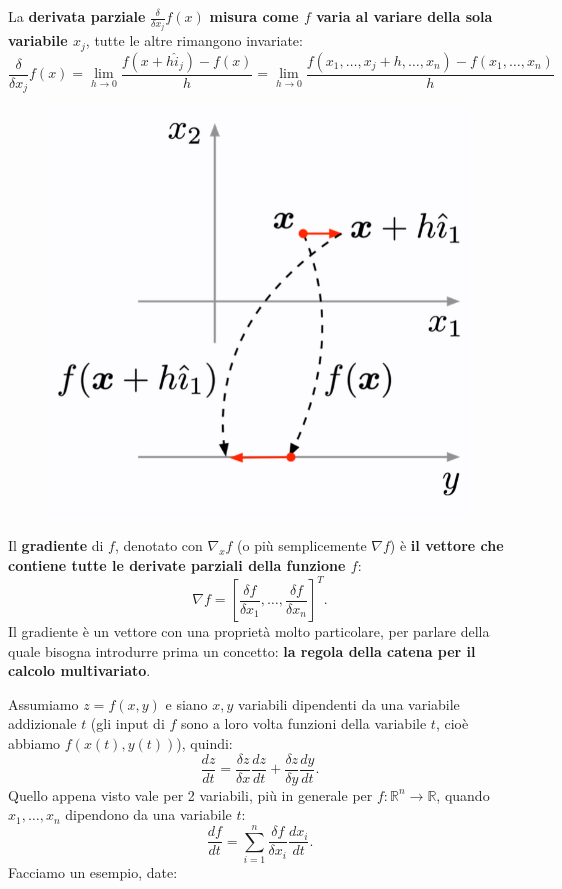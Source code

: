 La \textbf{derivata parziale} $\frac{\delta}{\delta x_j}f(x)$ \textbf{misura come $f$ varia al variare della sola variabile $x_j$}, tutte le altre rimangono invariate:
\begin{equation}
    \frac{\delta}{\delta x_j}f(x) = \lim_{h \rightarrow 0}\frac{f(x+h\hat{i}_j)-f(x)}{h} = \lim_{h \rightarrow 0}\frac{f(x_1,\dots,x_j+h,\dots,x_n)-f(x_1,\dots,x_n)}{h}
\end{equation}
\begin{figure}[!h]
    \includegraphics[scale=0.5]{images/prerequisites/partDerivatives.png}
    \centering
\end{figure}
\newline
Il \textbf{gradiente} di $f$, denotato con $\nabla_xf$ (o più semplicemente $\nabla f$) è \textbf{il vettore che contiene tutte le derivate parziali della funzione $f$}:
\begin{equation}
    \nabla f=\left[\frac{\delta f}{\delta x_1},\dots,\frac{\delta f}{\delta x_n}\right]^T.
\end{equation}
Il gradiente è un vettore con una proprietà molto particolare, per parlare della quale bisogna introdurre prima un concetto: \textbf{la regola della catena per il calcolo multivariato}.


Assumiamo $z=f(x,y)$ e siano $x,y$ variabili dipendenti da una variabile addizionale $t$ (gli input di $f$ sono a loro volta funzioni della variabile $t$, cioè abbiamo $f(x(t),y(t))$), quindi:
\begin{equation}
    \frac{dz}{dt}=\frac{\delta z}{\delta x}\frac{dz}{dt}+\frac{\delta z}{\delta y}\frac{dy}{dt}.
\end{equation}
Quello appena visto vale per 2 variabili, più in generale per $f:\mathbb{R}^n\rightarrow \mathbb{R}$, quando $x_1,\dots,x_n$ dipendono da una variabile $t$:
\begin{equation}
    \frac{df}{dt}=\sum^n_{i=1}\frac{\delta f}{\delta x_i}\frac{dx_i}{dt}.
\end{equation}
\newpage
Facciamo un esempio, date:

